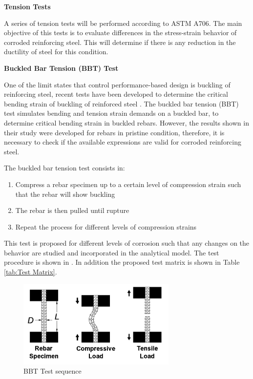 \textbf{Tension Tests}

A series of tension tests will be performed according to ASTM A706. The main objective of this tests is to evaluate differences in the stress-strain behavior of corroded reinforcing steel. This will determine if there is any reduction in the ductility of steel for this condition.
\newline

\textbf{Buckled Bar Tension (BBT) Test}

One of the limit states that control performance-based design is buckling of reinforcing steel, recent tests have been developed to determine the critical bending strain of buckling of reinforced steel \cite{Barcley2019}. The buckled bar tension (BBT) test simulates bending and tension strain demands on a buckled bar, to determine critical bending strain in buckled rebars. However, the results shown in their study were developed for rebars in pristine condition, therefore, it is necessary to check if the available expressions are valid for corroded reinforcing steel.

The buckled bar tension test consists in:

\begin{enumerate}
	\item Compress a rebar specimen up to a certain level of compression strain such that the rebar will show buckling
	\item The rebar is then pulled until rupture
	\item Repeat the process for different levels of compression strains 
\end{enumerate}

This test is proposed for different levels of corrosion such that any changes on the behavior are studied and incorporated in the analytical model. The test procedure is shown in . In addition the proposed test matrix is shown in Table \ref{tab:Test Matrix}.

\begin{figure}[htbp]
	\centering
	\includegraphics[width=0.7\textwidth]{Chapter-3/figs/BBT_Sequence}
	\caption{BBT Test sequence\cite{Barcley2019}}
	\label{fig:BBTseq}
\end{figure}

